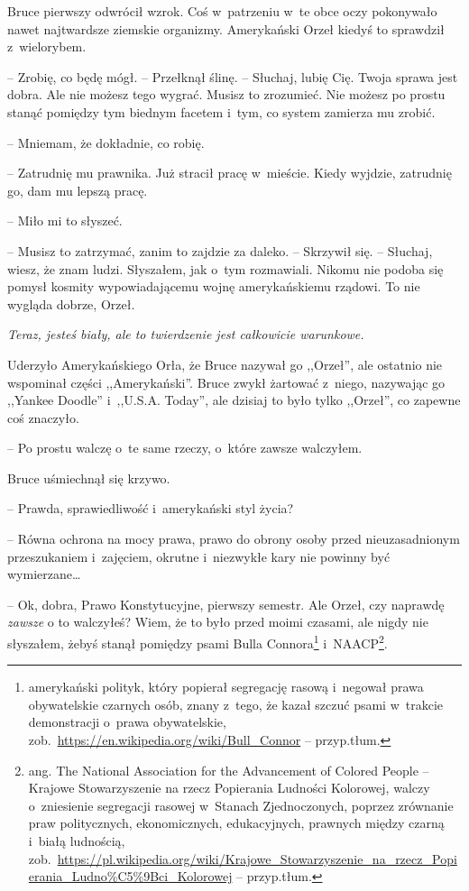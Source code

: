 \documentclass[oneside,polish,11pt,sfheadings]{mwbk}
\begin{document}
Bruce pierwszy odwrócił wzrok. Coś w~patrzeniu w~te obce oczy pokonywało
nawet najtwardsze ziemskie organizmy. Amerykański Orzeł kiedyś to
sprawdził z~wielorybem.

-- Zrobię, co będę mógł. -- Przełknął ślinę. -- Słuchaj, lubię Cię. Twoja
sprawa jest dobra. Ale nie możesz tego wygrać. Musisz to zrozumieć. Nie
możesz po prostu stanąć pomiędzy tym biednym facetem i~tym, co system
zamierza mu zrobić.

-- Mniemam, że dokładnie, co robię.

-- Zatrudnię mu prawnika. Już stracił pracę w~mieście. Kiedy wyjdzie,
zatrudnię go, dam mu lepszą pracę.

-- Miło mi to słyszeć.

-- Musisz to zatrzymać, zanim to zajdzie za daleko. -- Skrzywił się. -- Słuchaj, wiesz, że znam ludzi. Słyszałem, jak o~tym rozmawiali. Nikomu
nie podoba się pomysł kosmity wypowiadającemu wojnę amerykańskiemu
rządowi. To nie wygląda dobrze, Orzeł.

\textit{Teraz, jesteś biały, ale to twierdzenie jest całkowicie
warunkowe.}

Uderzyło Amerykańskiego Orła, że Bruce nazywał go ,,Orzeł'', ale
ostatnio nie wspominał części ,,Amerykański''. Bruce zwykł żartować z~niego, nazywając go ,,Yankee Doodle'' i~,,U.S.A. Today'', ale dzisiaj to
było tylko ,,Orzeł'', co zapewne coś znaczyło.

-- Po prostu walczę o~te same rzeczy, o~które zawsze walczyłem.

Bruce uśmiechnął się krzywo. 

-- Prawda, sprawiedliwość i~amerykański styl
życia?

-- Równa ochrona na mocy prawa, prawo do obrony osoby przed
nieuzasadnionym przeszukaniem i~zajęciem, okrutne i~niezwykłe kary nie
powinny być wymierzane\ldots 

-- Ok, dobra, Prawo Konstytucyjne, pierwszy semestr. Ale Orzeł, czy
naprawdę \textit{zawsze }o to walczyłeś? Wiem, że to było przed moimi
czasami, ale nigdy nie słyszałem, żebyś stanął pomiędzy psami Bulla
Connora\footnote{ amerykański polityk, który popierał segregację rasową i~negował prawa obywatelskie czarnych osób, znany z~tego, że kazał szczuć
psami w~trakcie demonstracji o~prawa obywatelskie,
zob.~\url{https://en.wikipedia.org/wiki/Bull\_Connor} -- przyp.tłum.} i~NAACP\footnote{ ang. The National Association for the
Advancement of Colored People -- Krajowe Stowarzyszenie na rzecz
Popierania Ludności Kolorowej, walczy o~zniesienie segregacji rasowej w~Stanach Zjednoczonych, poprzez zrównanie praw politycznych,
ekonomicznych, edukacyjnych, prawnych między czarną i~białą ludnością,
zob.~\url{https://pl.wikipedia.org/wiki/Krajowe\_Stowarzyszenie\_na\_rzecz\_Popierania\_Ludno\%C5\%9Bci\_Kolorowej}
-- przyp.tłum.}.
\end{document}
